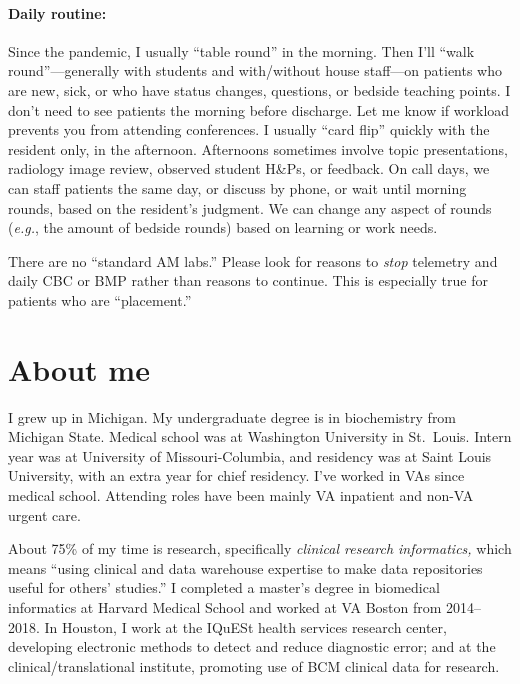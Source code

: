 \documentclass{tufte-handout}
\begin{document}
\paragraph{Daily routine:} Since the pandemic, I usually ``table
round'' in the morning. Then I'll ``walk round''---generally with
students and with/without house
staff---on patients who are new, sick, or who have status changes,
questions, or bedside teaching points. I don't need to see patients
the morning before discharge. Let me know if workload prevents you
from attending conferences. I usually ``card flip'' quickly with the
resident only, in the afternoon. Afternoons sometimes involve topic
presentations, radiology image review, observed student H\&Ps, or
feedback. On call days, we can staff patients the same day, or discuss
by phone, or wait until morning rounds, based on the resident's
judgment. We can change any aspect of rounds (\emph{e.g.}, the amount
of bedside rounds) based on learning or work needs.

There are no ``standard AM labs.'' Please look for reasons to
\emph{stop} telemetry and daily CBC or BMP rather than reasons to
continue. This is especially true for patients who are ``placement.''




\section{About me}

I grew up in Michigan. My undergraduate degree is in biochemistry from
Michigan State. Medical school was at Washington University in
St.\ Louis. Intern year was at University of Missouri-Columbia, and
residency was at Saint Louis University, with an extra year for chief
residency. I've worked in VAs since medical school. Attending roles
have been mainly VA inpatient and non-VA urgent care.


About 75\% of my time is research, specifically \emph{clinical
research informatics,} which means ``using clinical and data warehouse
expertise to make data repositories useful for others' studies.'' I
completed a master's degree in biomedical informatics at Harvard
Medical School and worked at VA Boston from 2014--2018. In Houston, I
work at the IQuESt health services research center, developing
electronic methods to detect and reduce diagnostic error; and at the
clinical/translational institute, promoting use of BCM clinical data
for research.
\end{document}
